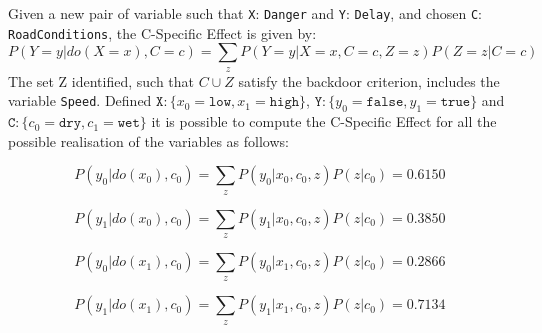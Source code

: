 \documentclass[a4paper,12pt]{article} %
\begin{document}
%
%
%
%
%
Given a new pair of variable such that \texttt{X}: \texttt{Danger} and \texttt{Y}: \texttt{Delay}, and chosen \texttt{C}: \texttt{RoadConditions}, the C-Specific Effect is given by:
\begin{equation}
P(Y=y|do(X=x), C=c)= \sum_{z} P(Y=y|X=x, C=c, Z=z) P(Z=z|C=c)
\end{equation}
The set Z identified, such that $C \cup Z$ satisfy the backdoor criterion, includes the variable \texttt{Speed}.
Defined $\mathtt{X}: \{ x_0=\mathtt{low}, x_1=\mathtt{high}\}$, $\mathtt{Y}: \{ y_0=\mathtt{false}, y_1=\mathtt{true}\}$ and $\mathtt{C}: \{ c_0=\mathtt{dry}, c_1=\mathtt{wet}\}$ it is possible to compute the C-Specific Effect for all the possible realisation of the variables as follows: 

\begin{equation*}
P(y_0|do(x_0), c_0)= \sum_{z} P(y_0|x_0, c_0, z) P(z|c_0)=0.6150
\end{equation*}

\begin{equation*}
P(y_1|do(x_0), c_0)= \sum_{z} P(y_1|x_0, c_0, z) P(z|c_0)=0.3850
\end{equation*}

\begin{equation*}
P(y_0|do(x_1), c_0)= \sum_{z} P(y_0|x_1, c_0, z) P(z|c_0)=0.2866
\end{equation*}

\begin{equation*}
P(y_1|do(x_1), c_0)= \sum_{z} P(y_1|x_1, c_0, z) P(z|c_0)=0.7134
\end{equation*}
\end{document}
